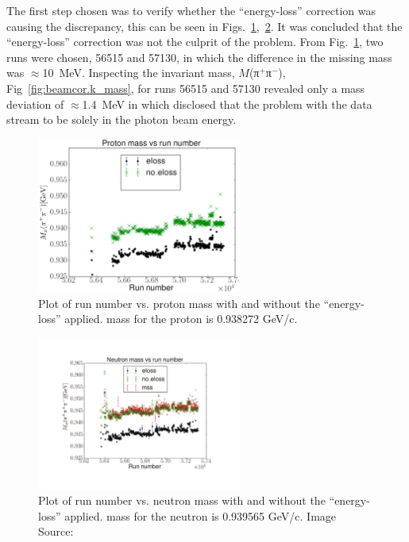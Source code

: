The first step chosen was to verify whether the ``energy-loss'' correction was causing the discrepancy, this can be seen in Figs.~\ref{fig:beamcor.p_mass},~\ref{fig:beamcor.n_mass}. It was concluded that the ``energy-loss'' correction was not the culprit of the problem. From Fig.~\ref{fig:beamcor.p_mass}, two runs were chosen, 56515 and 57130, in which the difference in the missing mass was $\approx$10~MeV. Inspecting the invariant mass, $M$(π$^+$π$^-$), Fig~\ref{fig:beamcor.k_mass}, for runs 56515 and 57130 revealed only a mass deviation of $\approx$1.4~MeV in which disclosed that the problem with the  data stream to be solely in the photon beam energy.


\begin{figure}\begin{center}
\includegraphics[width=0.6\textwidth]{figures/calib/tag/ecor/P_mass_issue.eps}
\caption[Run Number vs. Proton Mass ]{\label{fig:beamcor.p_mass}Plot of  run number vs. proton mass with and without the ``energy-loss'' applied.  mass for the proton is 0.938272 GeV/c. }
\end{center}\end{figure}

\begin{figure}\begin{center}
\includegraphics[width=0.6\textwidth]{figures/calib/tag/ecor/N_mass_issue.pdf}
\caption[Run Number vs. Neutron Mass]{\label{fig:beamcor.n_mass}Plot of  run number vs. neutron mass with and without the ``energy-loss'' applied.  mass for the neutron is 0.939565 GeV/c. Image Source:~\cite{bookwalter}}
\end{center}\end{figure}

